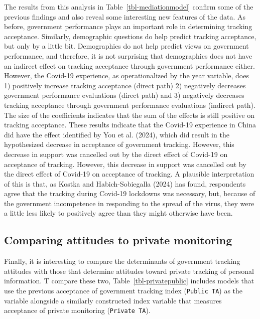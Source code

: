 \documentclass[
  letterpaper,
  DIV=11,
  numbers=noendperiod]{scrartcl}
\begin{document}
The results from this analysis in Table~\ref{tbl-mediationmodel} confirm
some of the previous findings and also reveal some interesting new
features of the data. As before, government performance plays an
important role in determining tracking acceptance. Similarly,
demographic questions do help predict tracking acceptance, but only by a
little bit. Demographics do not help predict views on government
performance, and therefore, it is not surprising that demographics does
not have an indirect effect on tracking acceptance through government
performance either. However, the Covid-19 experience, as operationalized
by the year variable, does 1) positively increase tracking acceptance
(direct path) 2) negatively decreases government performance evaluations
(direct path) and 3) negatively decreases tracking acceptance through
government performance evaluations (indirect path). The size of the
coefficients indicates that the sum of the effects is still positive on
tracking acceptance. These results indicate that the Covid-19 experience
in China did have the effect identified by You et al. (2024), which did
result in the hypothesized decrease in acceptance of government
tracking. However, this decrease in support was cancelled out by the
direct effect of Covid-19 on acceptance of tracking. However, this
decrease in support was cancelled out by the direct effect of Covid-19
on acceptance of tracking. A plausible interpretation of this is that,
as Kostka and Habich-Sobiegalla (2024) has found, respondents agree that
the tracking during Covid-19 lockdowns was necessary, but, because of
the government incompetence in responding to the spread of the virus,
they were a little less likely to positively agree than they might
otherwise have been.

\subsection{Comparing attitudes to private
monitoring}\label{comparing-attitudes-to-private-monitoring}

Finally, it is interesting to compare the determinants of government
tracking attitudes with those that determine attitudes toward private
tracking of personal information. T compare these two,
Table~\ref{tbl-privatepublic} includes models that use the previous
acceptance of government tracking index (\texttt{Public\ TA}) as the
variable alongside a similarly constructed index variable that measures
acceptance of private monitoring (\texttt{Private\ TA}).
\end{document}
